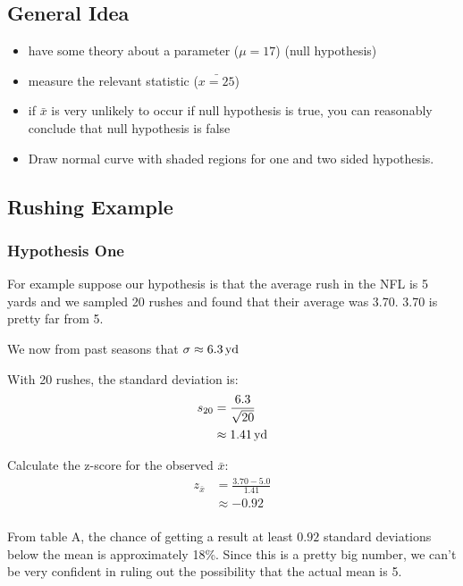 \documentclass[landscape]{exam}
\begin{document}
  \subsection{General Idea}
  \begin{itemize}
    \item have some theory about a parameter ($\mu = 17$) (null hypothesis)
    \item measure the relevant statistic ($\bar{x = 25}$)
    \item if $\bar{x}$ is very unlikely to occur if null hypothesis is true, you
      can reasonably conclude that null hypothesis is false
    \item Draw normal curve with shaded regions for one and two sided
      hypothesis.
  \end{itemize}

  \subsection{Rushing Example}

  \subsubsection{Hypothesis One}
  For example suppose our hypothesis is that the average rush in the NFL is 5
  yards and we sampled 20 rushes and found that their average was 3.70. 3.70 is
  pretty far from 5.

  We now from past seasons that $\sigma \approx \unit[6.3]{yd}$

  With 20 rushes, the standard deviation is:
  \begin{align*}
    s_{20} & = \frac{6.3}{\sqrt{20}} \\
           & \approx \unit[1.41]{yd} \\
  \end{align*}

  Calculate the z-score for the observed $\bar{x}$:
  \begin{align*}
    z_{\bar{x}} & = \frac{3.70 - 5.0}{1.41} \\
                & \approx -0.92 \\
  \end{align*}

  From table A, the chance of getting a result at least $0.92$ standard
  deviations below the mean is approximately 18\%. Since this is a pretty big
  number, we can't be very confident in ruling out the possibility that the
  actual mean is 5.
\end{document}

